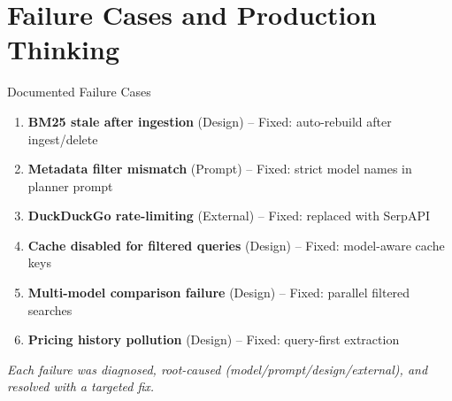 \documentclass[aspectratio=169]{beamer}
\begin{document}
\section{Failure Cases and Production Thinking}

\begin{frame}{Documented Failure Cases}
\small
\begin{enumerate}
  \item \textbf{BM25 stale after ingestion} (Design) -- Fixed: auto-rebuild after ingest/delete
  \item \textbf{Metadata filter mismatch} (Prompt) -- Fixed: strict model names in planner prompt
  \item \textbf{DuckDuckGo rate-limiting} (External) -- Fixed: replaced with SerpAPI
  \item \textbf{Cache disabled for filtered queries} (Design) -- Fixed: model-aware cache keys
  \item \textbf{Multi-model comparison failure} (Design) -- Fixed: parallel filtered searches
  \item \textbf{Pricing history pollution} (Design) -- Fixed: query-first extraction
\end{enumerate}

\vspace{0.5em}
\textit{Each failure was diagnosed, root-caused (model/prompt/design/external), and resolved with a targeted fix.}
\end{frame}
\end{document}

